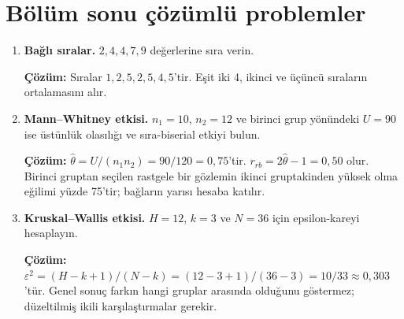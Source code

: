 \section{Bölüm sonu çözümlü problemler}

\begin{enumerate}
  \item \textbf{Bağlı sıralar.} $2,4,4,7,9$ değerlerine sıra verin.

  \textbf{Çözüm:} Sıralar $1,2{,}5,2{,}5,4,5$'tir. Eşit iki 4, ikinci ve üçüncü sıraların ortalamasını alır.

  \item \textbf{Mann--Whitney etkisi.} $n_1=10$, $n_2=12$ ve birinci grup yönündeki $U=90$ ise üstünlük olasılığı ve sıra-biserial etkiyi bulun.

  \textbf{Çözüm:} $\hat\theta=U/(n_1n_2)=90/120=0{,}75$'tir. $r_{rb}=2\hat\theta-1=0{,}50$ olur. Birinci gruptan seçilen rastgele bir gözlemin ikinci gruptakinden yüksek olma eğilimi yüzde 75'tir; bağların yarısı hesaba katılır.

  \item \textbf{Kruskal--Wallis etkisi.} $H=12$, $k=3$ ve $N=36$ için epsilon-kareyi hesaplayın.

  \textbf{Çözüm:} $\varepsilon^2=(H-k+1)/(N-k)=(12-3+1)/(36-3)=10/33\approx0{,}303$'tür. Genel sonuç farkın hangi gruplar arasında olduğunu göstermez; düzeltilmiş ikili karşılaştırmalar gerekir.
\end{enumerate}